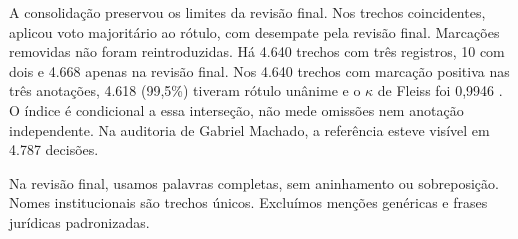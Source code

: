 A consolidação preservou os limites da revisão final. Nos trechos coincidentes, aplicou voto majoritário ao rótulo, com desempate pela revisão final. Marcações removidas não foram reintroduzidas. Há 4.640 trechos com três registros, 10 com dois e 4.668 apenas na revisão final. Nos 4.640 trechos com marcação positiva nas três anotações, 4.618 (99,5\%) tiveram rótulo unânime e o $\kappa$ de Fleiss foi 0,9946 \cite{fleiss1971}. O índice é condicional a essa interseção, não mede omissões nem anotação independente. Na auditoria de Gabriel Machado, a referência esteve visível em 4.787 decisões.

Na revisão final, usamos palavras completas, sem aninhamento ou sobreposição. Nomes institucionais são trechos únicos. Excluímos menções genéricas e frases jurídicas padronizadas.

